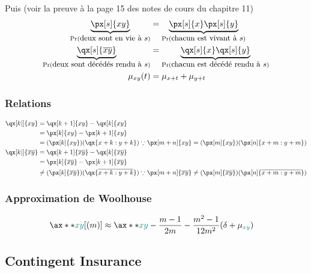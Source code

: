 \documentclass[10pt, french]{article}
\begin{document}
\begin{multicols*}{2}
Puis (voir la preuve à la page 15 des notes de cours du chapitre 11)
\begin{align*}
	\underbrace{\px[s]{xy}}_{\Pr(\small\shortstack{deux sont en vie à $s$})}
	&=	\underbrace{\px[s]{x}\px[s]{y}}_{\Pr(\small\shortstack{chacun est vivant à $s$})}		\\
	\underbrace{\qx[s]{\overline{xy}}}_{\Pr(\small\shortstack{deux sont décédés rendu à $s$})}
	&=	\underbrace{\qx[s]{x}\qx[s]{y}}_{\Pr(\small\shortstack{chacun est décédé rendu à $s$})}		\\
	\mu_{xy}(t)
	&=	\mu_{x + t} + \mu_{y + t}	
\end{align*}

\subsubsection*{Relations}
	\setlength{\mathindent}{-1cm}
\begin{align*}
	\qx[k|]{xy}
	&=	\qx[k + 1]{xy}	-	\qx[k]{xy}	\\
	&=	\px[k]{xy}	-	\px[k + 1]{xy}	\\
	&=	(\px[k]{xy})(\qx{x + k : y + k})		\because		\px[m + n]{xy} = (\px[m]{xy})(\px[n]{x + m : y + m})	\\
	\qx[k|]{\overline{xy}}
	&=	\qx[k + 1]{\overline{xy}}	-	\qx[k]{\overline{xy}}	\\
	&=	\px[k]{\overline{xy}}	-	\px[k + 1]{\overline{xy}}	\\
	&\neq	(\px[k]{\overline{xy}})(\qx{\overline{x + k : y + k}})	\because		\px[m + n]{\overline{xy}} \neq (\px[m]{\overline{xy}})(\px[n]{\overline{x + m : y + m}})	\\
\end{align*}
	\setlength{\mathindent}{1cm}

\subsubsection*{Approximation de Woolhouse}
\begin{align*}
	\ax**{\color{teal}xy}[(m)]
	&\approx	\ax**{\color{teal}xy}	-	\frac{m	-	1}{2m}	-	\frac{m^{2}	-	1}{12m^{2}}(\delta + \mu_{\color{teal}xy})	
\end{align*}

\columnbreak

\subsection{Contingent Insurance}


\end{multicols*}
\end{document}
